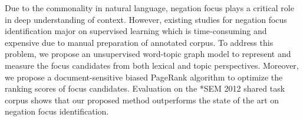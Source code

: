 Due to the commonality in natural language, negation focus plays a critical role in deep understanding of context. However, existing studies for negation focus identification major on supervised learning which is time-consuming and expensive due to manual preparation of annotated corpus. To address this problem, we propose an unsupervised word-topic graph model to represent and measure the focus candidates from both lexical and topic perspectives. Moreover, we propose a document-sensitive biased PageRank algorithm to optimize the ranking scores of focus candidates. Evaluation on the *SEM 2012 shared task corpus shows that our proposed method outperforms the state of the art on negation focus identification.
